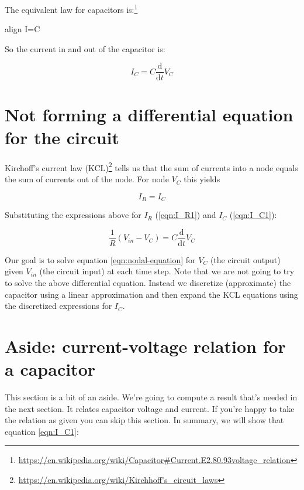 \documentclass{article}
\newcommand{\boxedeq}[2]{\begin{empheq}[box={\fboxsep=6pt\fbox}]{align}\label{#1}#2\end{empheq}}
\begin{document}
The equivalent law for capacitors is:\footnote{\url{https://en.wikipedia.org/wiki/Capacitor#Current.E2.80.93voltage_relation}}

\boxedeq{}{
	I=C
}

So the current in and out of the capacitor is:

\begin{equation}
\label{eqn:I_C1}
I_C = C\frac{\mathrm{d}}{\mathrm{d}t}V_C
\end{equation}


\section{Not forming a differential equation for the circuit}

Kirchoff's current law (KCL)\footnote{\url{https://en.wikipedia.org/wiki/Kirchhoff's_circuit_laws}}
tells us that the sum of currents into a node
equals the sum of currents out of the node. For node $V_{C}$ this yields

\begin{equation}
I_R = I_C
\end{equation}

Substituting the expressions above for $I_R$ (\ref{eqn:I_R1}) and $I_C$ (\ref{eqn:I_C1}):

\begin{equation}
\frac{1}{R}(V_{in} - V_C) = C\frac{\mathrm{d}}{\mathrm{d}t}V_C
\label{eqn:nodal-equation}
\end{equation}

Our goal is to solve equation \ref{eqn:nodal-equation} for $V_C$ (the circuit output) given $V_{in}$ (the
circuit input) at each time step. Note that we are not going to try
to solve the above differential equation. Instead we discretize
(approximate) the capacitor using a linear approximation and then
expand the KCL equations using the discretized expressions for $I_C$.

\section{Aside: current-voltage relation for a capacitor}

This section is a bit of an aside. We're going to compute a result
that's needed in the next section. It relates capacitor voltage and
current. If you're happy to take the relation as given you can skip this
section. In summary, we will show that equation \ref{eqn:I_C1}:
\end{document}
